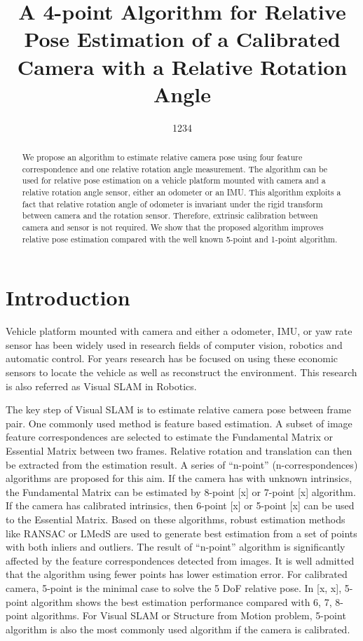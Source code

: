 \documentclass[letterpaper, 10 pt, conference]{ieeeconf}
\title{\LARGE \bf
A 4-point Algorithm for Relative Pose Estimation of a Calibrated Camera with a Relative Rotation Angle
}
\author{1234}
\begin{document}
\maketitle

\begin{abstract}
We propose an algorithm to estimate relative camera pose using four feature correspondence and one relative rotation angle measurement. The algorithm can be used for relative pose estimation on a vehicle platform mounted with camera and a relative rotation angle sensor, either an odometer or an IMU. This algorithm exploits a fact that relative rotation angle of odometer is invariant under the rigid transform between camera and the rotation sensor. Therefore, extrinsic calibration between camera and sensor is not required. We show that the proposed algorithm improves relative pose estimation compared with the well known 5-point and 1-point algorithm. 
\end{abstract}


\section{Introduction}
Vehicle platform mounted with camera and either a odometer, IMU, or yaw rate sensor has been widely used in research fields of computer vision, robotics and automatic control. For years research has be focused on using these economic sensors to locate the vehicle as well as reconstruct the environment. This research is also referred as Visual SLAM in Robotics. 

The key step of Visual SLAM is to estimate relative camera pose between frame pair. One commonly used method is feature based estimation. A subset of image feature correspondences are selected to estimate the Fundamental Matrix or Essential Matrix between two frames. Relative rotation and translation can then be extracted from the estimation result. A series of ``n-point'' (n-correspondences) algorithms are proposed for this aim. If the camera has with unknown intrinsics, the Fundamental Matrix can be estimated by 8-point [x] or 7-point [x] algorithm. If the camera has calibrated intrinsics, then 6-point [x] or 5-point [x] can be used to the Essential Matrix. Based on these algorithms, robust estimation methods like RANSAC or LMedS are used to generate best estimation from a set of points with both inliers and outliers. The result of ``n-point'' algorithm is significantly affected by the feature correspondences detected from images. It is well admitted that the algorithm using fewer points has lower estimation error. For calibrated camera, 5-point is the minimal case to solve the 5 DoF relative pose. In [x, x], 5-point algorithm shows the best estimation performance compared with 6, 7, 8-point algorithms. For Visual SLAM or Structure from Motion problem, 5-point algorithm is also the most commonly used algorithm if the camera is calibrated. 
\end{document}
